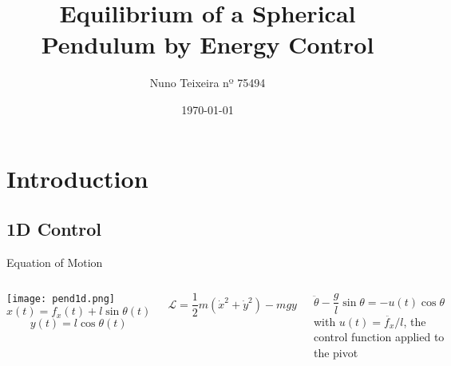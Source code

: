 \documentclass{beamer}
\title[Equilibrium of a Spherical Pendulum]{Equilibrium of a Spherical Pendulum by Energy Control}
\author[Nuno Teixeira]{Nuno Teixeira nº 75494}
\institute{Instituto Superior Técnico}
\date{\today}
\begin{document}
\begin{frame}
  \titlepage
\end{frame}


\section{Introduction}
\subsection{1D Control}
\begin{frame}[t]{Equation of Motion}
       \begin{columns}
             \centering
             \texttt{[image: pend1d.png]}
             \begin{equation}
x(t)=f_x(t)+ l \sin{\theta}(t)
\label{x1d}
\end{equation}
\begin{equation}
y(t)= l \cos{\theta}(t)
\label{y1d}
\end{equation}
\vspace{0.5 cm}


\begin{equation}
    \mathcal{L}=\frac{1}{2}m\left(\dot{x}^2+\dot{y}^2\right)-m g y
    \label{l1d}
\end{equation}
\vspace{0.5 cm}


\begin{equation}
    \ddot{\theta}-\frac{g}{l}\sin{\theta}=-u(t)\cos{\theta}
    \label{theta1d}
\end{equation}
with $u(t)=\ddot{f_x}/l$, the control function applied to the pivot
\end{columns} 
\end{frame}
\end{document}
